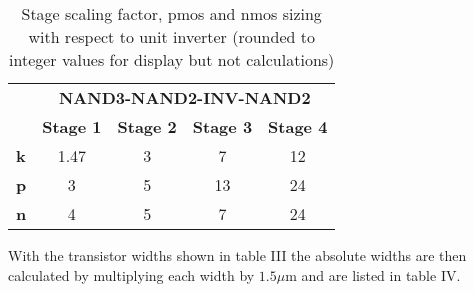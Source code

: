 \documentclass[conference]{IEEEtran}
\begin{document}
\begin{table}[H]
\center
\begin{tabular}{l|c|c|c|c|}
\cline{2-5}
                                 & \multicolumn{4}{c|}{\textbf{NAND3-NAND2-INV-NAND2}}                                                                                                           \\ \cline{2-5} 
                                 & \multicolumn{1}{l|}{\textbf{Stage 1}} & \multicolumn{1}{l|}{\textbf{Stage 2}} & \multicolumn{1}{l|}{\textbf{Stage 3}} & \multicolumn{1}{l|}{\textbf{Stage 4}} \\ \hline
\multicolumn{1}{|l|}{\textbf{k}} & 1.47                                  & 3                                     & 7                                     & 12                                    \\ \hline
\multicolumn{1}{|l|}{\textbf{p}} & 3                                     & 5                                     & 13                                    & 24                                    \\ \hline
\multicolumn{1}{|l|}{\textbf{n}} & 4                                     & 5                                     & 7                                     & 24                                    \\ \hline
\end{tabular}
\label{tab:StageSizeCalcs}
\caption{Stage scaling factor, pmos and nmos sizing with respect to unit inverter (rounded to integer values for display but not calculations)}
\end{table}

With the transistor widths shown in table III the absolute widths are then calculated by multiplying each width by $1.5\mu$m and are listed in table IV.
\end{document}
